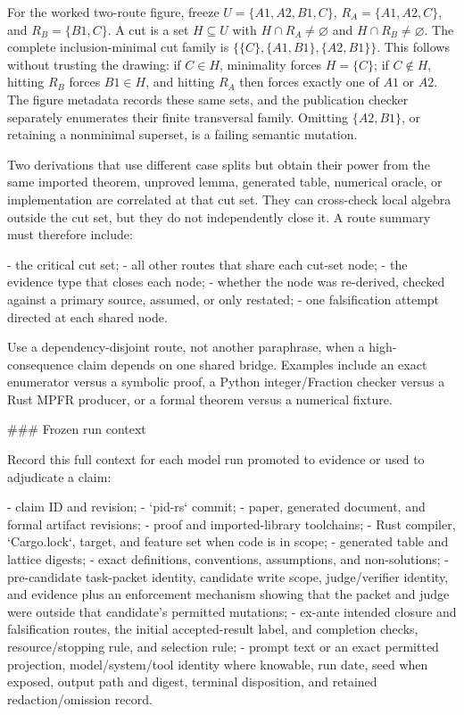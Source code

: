 \documentclass[11pt]{article}
\begin{document}
\begin{markdown}
For the worked two-route figure, freeze
$U=\{A1,A2,B1,C\}$, $R_A=\{A1,A2,C\}$, and $R_B=\{B1,C\}$. A cut is a set
$H\subseteq U$ with $H\cap R_A\ne\varnothing$ and $H\cap R_B\ne\varnothing$. The complete
inclusion-minimal cut family is
$\{\{C\},\{A1,B1\},\{A2,B1\}\}$. This follows without trusting the drawing: if $C\in H$,
minimality forces $H=\{C\}$; if $C\notin H$, hitting $R_B$ forces $B1\in H$, and hitting
$R_A$ then forces exactly one of $A1$ or $A2$. The figure metadata records these same sets, and
the publication checker separately enumerates their finite transversal family. Omitting
$\{A2,B1\}$, or retaining a nonminimal superset, is a failing semantic mutation.

Two derivations that use different case splits but obtain their power from the same imported
theorem, unproved lemma, generated table, numerical oracle, or implementation are correlated at
that cut set. They can cross-check local algebra outside the cut set, but they do not independently
close it. A route summary must therefore include:

- the critical cut set;
- all other routes that share each cut-set node;
- the evidence type that closes each node;
- whether the node was re-derived, checked against a primary source, assumed, or only restated;
- one falsification attempt directed at each shared node.

Use a dependency-disjoint route, not another paraphrase, when a high-consequence claim depends on
one shared bridge. Examples include an exact enumerator versus a symbolic proof, a Python
integer/Fraction checker versus a Rust MPFR producer, or a formal theorem versus a numerical
fixture.

### Frozen run context

Record this full context for each model run promoted to evidence or used to adjudicate a claim:

- claim ID and revision;
- `pid-rs` commit;
- paper, generated document, and formal artifact revisions;
- proof and imported-library toolchains;
- Rust compiler, `Cargo.lock`, target, and feature set when code is in scope;
- generated table and lattice digests;
- exact definitions, conventions, assumptions, and non-solutions;
- pre-candidate task-packet identity, candidate write scope, judge/verifier identity, and evidence
  plus an enforcement mechanism showing that the packet and judge were outside that candidate's
  permitted mutations;
- ex-ante intended closure and falsification routes, the initial accepted-result label, and
  completion checks, resource/stopping rule, and selection rule;
- prompt text or an exact permitted projection, model/system/tool identity where knowable, run date,
  seed when exposed, output path and digest, terminal disposition, and retained redaction/omission
  record.


\end{markdown}
\end{document}
